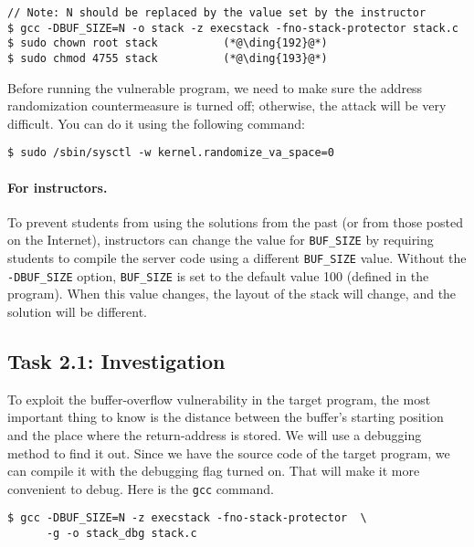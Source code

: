 \begin{lstlisting}
// Note: N should be replaced by the value set by the instructor
$ gcc -DBUF_SIZE=N -o stack -z execstack -fno-stack-protector stack.c
$ sudo chown root stack          (*@\ding{192}@*)
$ sudo chmod 4755 stack          (*@\ding{193}@*)
\end{lstlisting}


Before running the vulnerable program, we need to make sure the 
address randomization countermeasure is turned off; otherwise, the 
attack will be very difficult. 
You can do it using the following command:

\begin{lstlisting}
$ sudo /sbin/sysctl -w kernel.randomize_va_space=0
\end{lstlisting}

 

\paragraph{For instructors.}
To prevent students from using the solutions from the past (or from those
posted on the Internet), instructors can change the
value for \texttt{BUF\_SIZE} by requiring students to compile the
server code using a different \texttt{BUF\_SIZE} value.
Without the \texttt{-DBUF\_SIZE}
option, \texttt{BUF\_SIZE} is set to the default value 100 (defined
in the program).
When this value changes, the layout of the stack
will change, and the solution will be different.


\subsection{Task 2.1: Investigation} 

To exploit the buffer-overflow vulnerability in the target program,
the most important thing to know is the distance between the 
buffer's starting position and the place where the return-address
is stored. We will use a debugging method to find it out.
Since we have the source code of the target program, we
can compile it with the debugging flag turned on. That will make it more
convenient to debug. Here is the \texttt{gcc} command.

\begin{lstlisting}
$ gcc -DBUF_SIZE=N -z execstack -fno-stack-protector  \
      -g -o stack_dbg stack.c
\end{lstlisting}

